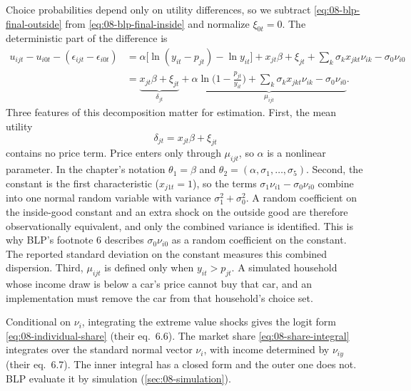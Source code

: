 Choice probabilities depend only on utility differences, so we subtract \eqref{eq:08-blp-final-outside} from
\eqref{eq:08-blp-final-inside} and normalize $\xi_{0t}=0$. The deterministic part of the difference is
\begin{align*}
u_{ijt}-u_{i0t}-(\epsilon_{ijt}-\epsilon_{i0t})
 &=\alpha\big[\ln(y_{it}-p_{jt})-\ln y_{it}\big]+x_{jt}\beta+\xi_{jt}
   +\sum_k\sigma_kx_{jkt}\nu_{ik}-\sigma_0\nu_{i0}\\
 &=\underbrace{x_{jt}\beta+\xi_{jt}}_{\delta_{jt}}
   +\underbrace{\alpha\ln\Big(1-\frac{p_{jt}}{y_{it}}\Big)+\sum_k\sigma_kx_{jkt}\nu_{ik}
   -\sigma_0\nu_{i0}}_{\mu_{ijt}} .
\end{align*}
Three features of this decomposition matter for estimation. First, the mean utility
\begin{equation}\label{eq:08-blp-delta}
\delta_{jt}=x_{jt}\beta+\xi_{jt}
\end{equation}
contains no price term. Price enters only through $\mu_{ijt}$, so $\alpha$ is a nonlinear parameter.
In the chapter's notation $\theta_1=\beta$ and $\theta_2=(\alpha,\sigma_1,\dots,\sigma_5)$. Second, the
constant is the first characteristic ($x_{j1t}=1$), so the terms $\sigma_1\nu_{i1}-\sigma_0\nu_{i0}$
combine into one normal random variable with variance $\sigma_1^2+\sigma_0^2$. A random coefficient on
the inside-good constant and an extra shock on the outside good are therefore observationally
equivalent, and only the combined variance is identified. This is why BLP's footnote 6 describes
$\sigma_0\nu_{i0}$ as a random coefficient on the constant. The reported standard deviation on the
constant measures this combined dispersion. Third,
$\mu_{ijt}$ is defined only when $y_{it}>p_{jt}$. A simulated household whose income draw is below a
car's price cannot buy that car, and an implementation must remove the car from that household's
choice set.

Conditional on $\nu_i$, integrating the extreme value shocks gives the logit form
\eqref{eq:08-individual-share} (their eq.~6.6). The market share \eqref{eq:08-share-integral} integrates over the
standard normal vector $\nu_i$, with income determined by $\nu_{iy}$ (their eq.~6.7). The inner integral has a
closed form and the outer one does not. BLP evaluate it by simulation (\cref{sec:08-simulation}).

